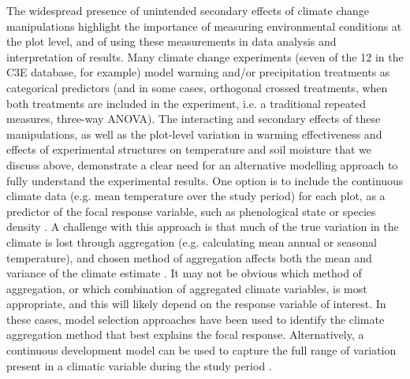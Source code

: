 \documentclass{article}
\begin{document}
\par The widespread presence of unintended secondary effects of climate change manipulations highlight the importance of measuring environmental conditions at the plot level, and of using these measurements in data analysis and interpretation of results. Many climate change experiments (seven of the 12 in the C3E database, for example) model warming and/or precipitation treatments as categorical predictors (and in some cases, orthogonal crossed treatments, when both treatments are included in the experiment, i.e. a traditional repeated measures, three-way ANOVA). The interacting and secondary effects of these manipulations, as well as the plot-level variation in warming effectiveness and effects of experimental structures on temperature and soil moisture that we discuss above, demonstrate a clear need for an alternative modelling approach to fully understand the experimental results. One option is to include the continuous climate data (e.g. mean temperature over the study period) for each plot, as a predictor of the focal response variable, such as phenological state or species density \citep [e.g.][]{marchin2015, pelini2014}. A challenge with this approach is that much of the true variation in the climate is lost through aggregation (e.g. calculating mean annual or seasonal temperature), and chosen method of aggregation affects both the mean and variance of the climate estimate \citep [e.g.][]{clark2014b}. It may not be obvious which method of aggregation, or which combination of aggregated climate variables, is most appropriate, and this will likely depend on the response variable of interest. In these cases, model selection approaches have been used to identify the climate aggregation method that best explains the focal response\citep [e.g.][]{morin2010}. Alternatively, a continuous development model can be used to capture the full range of variation present in a climatic variable during the study period \citep [e.g.][]{clark2014b}.
\end{document}
